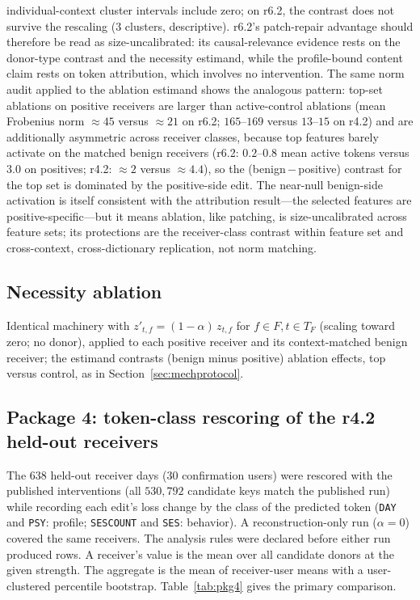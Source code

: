\documentclass[10pt]{article} %
\newcommand{\rsix}{r6.2}
\newcommand{\rfour}{r4.2}
\begin{document}
individual-context cluster intervals include zero; on \rsix{}, the contrast
does not survive the rescaling ($3$ clusters, descriptive). \rsix{}'s
patch-repair advantage should therefore be read as size-uncalibrated: its
causal-relevance evidence rests on the donor-type contrast and the necessity
estimand, while the profile-bound content claim rests on token attribution,
which involves no intervention. The same norm audit applied to the ablation
estimand shows the analogous pattern: top-set ablations on positive
receivers are larger than active-control ablations (mean Frobenius norm
$\approx 45$ versus $\approx 21$ on \rsix{}; $165$--$169$ versus
$13$--$15$ on \rfour{}) and are additionally asymmetric across receiver
classes, because top features barely activate on the matched benign
receivers (\rsix{}: $0.2$--$0.8$ mean active tokens versus $3.0$ on
positives; \rfour{}: $\approx 2$ versus $\approx 4.4$), so the
(benign\,$-$\,positive) contrast for the top set is dominated by the
positive-side edit. The near-null benign-side activation is itself
consistent with the attribution result---the selected features are
positive-specific---but it means ablation, like patching, is
size-uncalibrated across feature sets; its protections are the
receiver-class contrast within feature set and cross-context,
cross-dictionary replication, not norm matching.

\subsection{Necessity ablation}
Identical machinery with $z'_{t,f} = (1-\alpha)\,z_{t,f}$ for
$f \in F, t \in T_F$ (scaling toward zero; no donor), applied to each
positive receiver and its context-matched benign receiver; the estimand
contrasts (benign minus positive) ablation effects, top versus control, as in
Section~\ref{sec:mechprotocol}.

\subsection{Package 4: token-class rescoring of the \rfour{} held-out receivers}
\label{app:pkg4}
The $638$ held-out receiver days ($30$ confirmation users) were rescored
with the published interventions (all $530{,}792$ candidate keys match the
published run) while recording each edit's loss change by the class of the
predicted token (\texttt{DAY} and \texttt{PSY}: profile; \texttt{SESCOUNT}
and \texttt{SES}: behavior). A reconstruction-only run ($\alpha{=}0$) covered
the same receivers. The analysis rules were declared before either run
produced rows. A receiver's value is the mean over all candidate donors at
the given strength. The aggregate is the mean of receiver-user means with a
user-clustered percentile bootstrap. Table~\ref{tab:pkg4} gives the primary
comparison.
\end{document}
